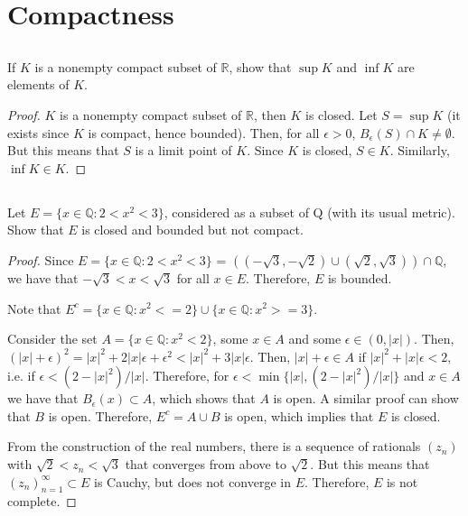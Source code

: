 \section{Compactness}

\subsection{} If $K$ is a nonempty compact subset of $\mathbb{R}$, show that $\sup K$ and $\inf K$ are elements of $K$.

\begin{proof}
$K$ is a nonempty compact subset of $\mathbb{R}$, then $K$ is closed.
Let $S = \sup K$ (it exists since $K$ is compact, hence bounded). Then, for all $\epsilon > 0$, $B_\epsilon(S) \cap K \neq \emptyset$. But this means that $S$ is a limit point of $K$. Since $K$ is closed, $S \in K$. Similarly, $\inf K \in K$. 
\end{proof}

\subsection{} Let $E = \{x \in \mathbb{Q} : 2 < x^2 < 3\}$, considered as a subset of Q (with its usual metric). Show that $E$ is closed and bounded but not compact.

\begin{proof}
Since $E = \{x \in \mathbb{Q} : 2 < x^2 < 3\}$ = $((-\sqrt{3}, -\sqrt{2}) \cup (\sqrt{2}, \sqrt{3})) \cap \mathbb{Q}$, we have that $-\sqrt{3} < x < \sqrt{3}$ for all $x \in E$. Therefore, $E$ is bounded.

Note that $E^c = \{x \in \mathbb{Q} : x^2 <= 2\} \cup \{x \in \mathbb{Q} : x^2 >= 3\}$.

Consider the set $A = \{x \in \mathbb{Q} : x^2 < 2\}$, some $x \in A$ and some $\epsilon \in (0, |x|)$. Then, $(|x| + \epsilon)^2 = |x|^2 + 2|x|\epsilon + \epsilon^2 < |x|^2 + 3|x|\epsilon$. Then, $|x| + \epsilon \in A$ if $|x|^2 + |x|\epsilon < 2$, i.e. if $\epsilon < (2-|x|^2)/|x|$. Therefore, for $\epsilon < \min\{|x|, (2-|x|^2)/|x|\}$ and $x \in A$ we have that $B_\epsilon(x) \subset A$, which shows that $A$ is open. A similar proof can show that $B$ is open.  Therefore, $E^c = A \cup B$ is open, which implies that $E$ is closed.



From the construction of the real numbers, there is a sequence of rationals $(z_n)$ with $\sqrt{2} < z_n < \sqrt{3}$ that converges from above to $\sqrt{2}$. But this means that $(z_n)_{n=1}^\infty \subset E$ is Cauchy, but does not converge in $E$. Therefore, $E$ is not complete.

\end{proof}

